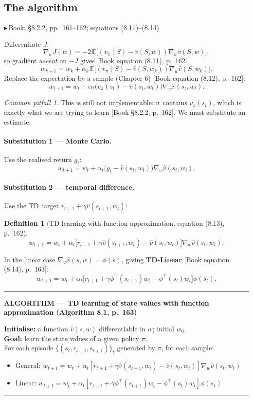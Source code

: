 \documentclass[11pt, letterpaper]{article}
\theoremstyle{runin}
\newtheorem*{definition}{Definition}
\theoremstyle{runinplain}
\theoremstyle{remark}
\newtheorem*{warning}{Common pitfall}
\newcommand{\E}{\mathbb{E}}
\newcommand{\bk}[1]{{\color{bookblue}\small$\blacktriangleright$\,\textsf{Book: #1}}}
\newcommand{\bkin}[1]{{\color{bookblue}\small[\textsf{Book #1}]}}
\newenvironment{algobox}[1]
  {\par\medskip\noindent\rule{\textwidth}{0.9pt}\par\nobreak\vspace{0.25em}
   \noindent\textbf{\small ALGORITHM --- #1}\par\nobreak\vspace{0.15em}
   \small}
  {\par\nobreak\vspace{0.25em}\noindent\rule{\textwidth}{0.9pt}\par\medskip}
\begin{document}
\subsection{The algorithm}

\bk{\S8.2.2, pp.~161--162; equations (8.11)--(8.14)}

Differentiate $J$:
\[
  \nabla_wJ(w)=-2\,\E\bigl[(v_\pi(S)-\hat v(S,w))\nabla_w\hat v(S,w)\bigr],
\]
so gradient \emph{ascent} on $-J$ gives \bkin{equation (8.11), p.~162}
\[
  w_{k+1}=w_k+\alpha_k\,\E\bigl[(v_\pi(S)-\hat v(S,w_k))\nabla_w\hat v(S,w_k)\bigr].
\]
Replace the expectation by a sample (Chapter 6) \bkin{equation (8.12), p.~162}:
\[
  w_{t+1}=w_t+\alpha_t\bigl(v_\pi(s_t)-\hat v(s_t,w_t)\bigr)\nabla_w\hat v(s_t,w_t).
\]

\begin{warning}
This is still not implementable: it contains $v_\pi(s_t)$, which is exactly what we
are trying to learn \bkin{\S8.2.2, p.~162}. We must substitute an estimate.
\end{warning}

\paragraph{Substitution 1 --- Monte Carlo.} Use the realised return $g_t$:
\[
  w_{t+1}=w_t+\alpha_t\bigl(g_t-\hat v(s_t,w_t)\bigr)\nabla_w\hat v(s_t,w_t).
\]

\paragraph{Substitution 2 --- temporal difference.} Use the TD target
$r_{t+1}+\gamma\hat v(s_{t+1},w_t)$:

\begin{definition}[TD learning with function approximation, equation (8.13), p.~162]
\[
  \boxed{\;
  w_{t+1}=w_t+\alpha_t\bigl[r_{t+1}+\gamma\hat v(s_{t+1},w_t)-\hat v(s_t,w_t)\bigr]
    \nabla_w\hat v(s_t,w_t).\;}
\]
\end{definition}

In the linear case $\nabla_w\hat v(s,w)=\phi(s)$, giving \textbf{TD-Linear}
\bkin{equation (8.14), p.~163}:
\[
  w_{t+1}=w_t+\alpha_t\bigl[r_{t+1}+\gamma\phi^{\!\top}(s_{t+1})w_t-\phi^{\!\top}(s_t)w_t\bigr]\phi(s_t).
\]

\begin{algobox}{TD learning of state values with function approximation (Algorithm 8.1, p.~163)}
\textbf{Initialise:} a function $\hat v(s,w)$ differentiable in $w$; initial $w_0$.\\
\textbf{Goal:} learn the state values of a given policy $\pi$.\\
For each episode $\{(s_t,r_{t+1},s_{t+1})\}_t$ generated by $\pi$, for each sample:
\begin{itemize}\itemsep0pt
  \item General: $w_{t+1}=w_t+\alpha_t[r_{t+1}+\gamma\hat v(s_{t+1},w_t)-\hat v(s_t,w_t)]\nabla_w\hat v(s_t,w_t)$
  \item Linear: $w_{t+1}=w_t+\alpha_t[r_{t+1}+\gamma\phi^{\!\top}(s_{t+1})w_t-\phi^{\!\top}(s_t)w_t]\phi(s_t)$
\end{itemize}
\end{algobox}
\end{document}
